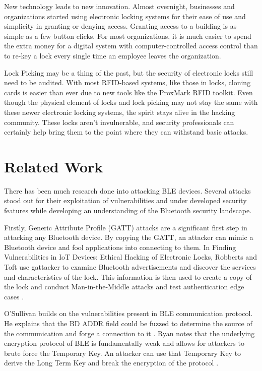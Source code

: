 \documentclass[10pt,twocolumn,letterpaper]{article}
\begin{document}
New technology leads to new innovation.  Almost overnight, businesses and organizations started using electronic locking systems for their ease of use and simplicity in granting or denying access.  Granting access to a building is as simple as a few button clicks.  For most organizations, it is much easier to spend the extra money for a digital system with computer-controlled access control than to re-key a lock every single time an employee leaves the organization.

Lock Picking may be a thing of the past, but the security of electronic locks still need to be audited.  With most RFID-based systems, like those in locks, cloning cards is easier than ever due to new tools like the ProxMark RFID toolkit.\cite{7945583}  Even though the physical element of locks and lock picking may not stay the same with these newer electronic locking systems, the spirit stays alive in the hacking community.  These locks aren't invulnerable, and security professionals can certainly help bring them to the point where they can withstand basic attacks.


\section{Related Work}
There has been much research done into attacking BLE devices. Several attacks stood out for their exploitation of vulnerabilities and under developed security features while developing an understanding of the Bluetooth security landscape.

Firstly, Generic Attribute Profile (GATT) attacks are a significant first step in attacking any Bluetooth device. By copying the GATT, an attacker can mimic a Bluetooth device and fool applications into connecting to them. In Finding Vulnerabilities in IoT Devices: Ethical Hacking of Electronic Locks, Robberts and Toft use gattacker to examine Bluetooth advertisements and discover the services and characteristics of the lock. This information is then used to create a copy of the lock and conduct Man-in-the-Middle attacks and test authentication edge cases \cite{KTH}.

O'Sullivan builds on the vulnerabilities present in BLE communication protocol. He explains that the BD ADDR field could be fuzzed to determine the source of the communication and forge a connection to it \cite{osullivan}. Ryan notes that the underlying encryption protocol of BLE is fundamentally weak and allows for attackers to brute force the Temporary Key. An attacker can use that Temporary Key to derive the Long Term Key and break the encryption of the protocol \cite{mryan13}.
\end{document}
